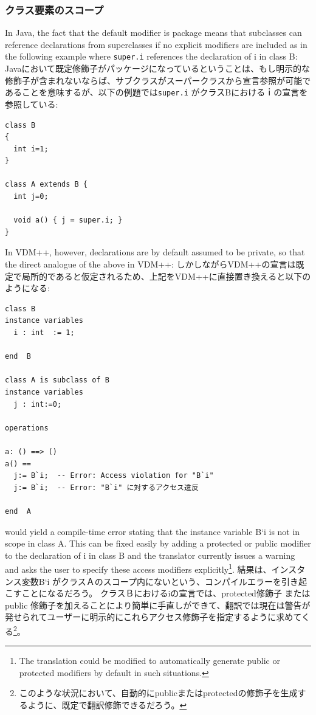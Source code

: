 \documentclass[\pformat,12pt]{jarticle}
\begin{document}
\subsubsection{クラス要素のスコープ}

In Java, the fact that the default modifier is package means that
subclasses can reference declarations from superclasses if no explicit
modifiers are included as in the following example where
\texttt{super.i} references the declaration of i in class B: 
Javaにおいて既定修飾子がパッケージになっているということは、もし明示的な修飾子が含まれないならば、サブクラスがスーパークラスから宣言参照が可能であることを意味するが、以下の例題では\texttt{super.i} がクラスBにおけるｉの宣言を参照している: 

\begin{small}
\begin{verbatim}
class B
{
  int i=1;
}

class A extends B {
  int j=0;

  void a() { j = super.i; }
}
\end{verbatim}
\end{small}

In VDM++, however, declarations are by default assumed to be private,
so that the direct analogue of the above in VDM++:
しかしながらVDM++の宣言は既定で局所的であると仮定されるため、上記をVDM++に直接置き換えると以下のようになる:

\begin{small}
\begin{verbatim}
class B
instance variables 
  i : int  := 1;
  
end  B

class A is subclass of B
instance variables 
  j : int:=0;

operations

a: () ==> ()
a() == 
  j:= B`i;  -- Error: Access violation for "B`i"
  j:= B`i;  -- Error: "B`i" に対するアクセス違反

end  A
\end{verbatim}
\end{small}

would yield a compile-time error stating that the instance variable B`i is
not in scope in class A. This can be fixed easily by adding a
protected or public modifier to the declaration of i in class B and
the translator currently issues a warning and asks the user to specify
these access modifiers explicitly\footnote{The translation could be
  modified to automatically generate public or protected modifiers by
  default in such situations.}.
結果は、インスタンス変数B`i がクラスＡのスコープ内にないという、コンパイルエラーを引き起こすことになるだろう。
クラスＢにおけるiの宣言では、protected修飾子 または public 修飾子を加えることにより簡単に手直しができて、翻訳では現在は警告が発せられてユーザーに明示的にこれらアクセス修飾子を指定するように求めてくる\footnote{このような状況において、自動的にpublicまたはprotectedの修飾子を生成するように、既定で翻訳修飾できるだろう。}。
\end{document}
